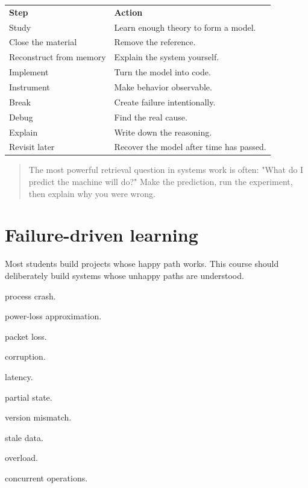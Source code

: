 \documentclass[11pt,letterpaper]{article}
\begin{document}
\begin{center}
\small
\begin{tabular}{>{\raggedright\arraybackslash}p{}>{\raggedright\arraybackslash}p{}}
\textbf{Step} & \textbf{Action} \\
Study & Learn enough theory to form a model. \\
Close the material & Remove the reference. \\
Reconstruct from memory & Explain the system yourself. \\
Implement & Turn the model into code. \\
Instrument & Make behavior observable. \\
Break & Create failure intentionally. \\
Debug & Find the real cause. \\
Explain & Write down the reasoning. \\
Revisit later & Recover the model after time has passed. \\
\end{tabular}
\end{center}

\begin{quote}
The most powerful retrieval question in systems work is often: "What do I predict the machine will do?" Make the prediction, run the experiment, then explain why you were wrong.
\end{quote}

\section{Failure-driven learning}\label{sec:21}

Most students build projects whose happy path works. This course should deliberately build systems whose unhappy paths are understood.

\begin{topics}

\item process crash.

\item power-loss approximation.

\item packet loss.

\item corruption.

\item latency.

\item partial state.

\item version mismatch.

\item stale data.

\item overload.

\item concurrent operations.

\end{topics}
\end{document}
